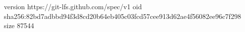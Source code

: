 version https://git-lfs.github.com/spec/v1
oid sha256:82bd7adbbd94f3d8cd20b64eb405c03fcd57cee913d62ae4f56082ee96c7f298
size 87544
